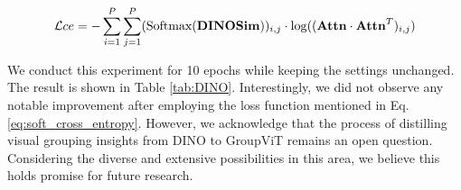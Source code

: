 \begin{equation}
\label{eq:soft_cross_entropy}
\mathcal{L}{\text{${ce}$}} = -\sum_{i=1}^{P} \sum_{j=1}^{P} (\text{Softmax}(\mathbf{DINOSim}))_{i,j} \cdot \log((\text{\textbf{Attn}} \cdot \text{\textbf{Attn}}^T)_{i,j})
\end{equation}

We conduct this experiment for 10 epochs while keeping the settings unchanged. The result is shown in Table \ref{tab:DINO}. Interestingly, we did not observe any notable improvement after employing the loss function mentioned in Eq. \ref{eq:soft_cross_entropy}. However, we acknowledge that the process of distilling visual grouping insights from DINO to GroupViT remains an open question. Considering the diverse and extensive possibilities in this area, we believe this holds promise for future research.











